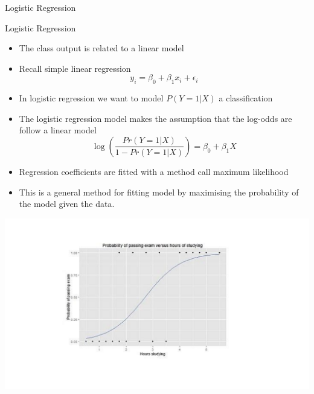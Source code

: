 \documentclass{bredelebeamer}
\begin{document}
\begin{frame}{Logistic Regression}

\begin{exampleblock}{Logistic Regression}
	
	\begin{itemize}
		\item The class output is related to a linear model
		\item Recall simple linear regression
		\begin{equation}
		y_i = \beta_0 + \beta_1x_i + \epsilon_i
		\end{equation}
		\item In logistic regression we want to model $P(Y = 1|X)$ a classification
		\item The logistic regression model makes the assumption that the log-odds are follow a linear model
		\begin{equation}
		\log\left(\frac{Pr(Y = 1|X)}{1 - Pr(Y = 1|X)}\right) = \beta_0 + \beta_1 X
		\end{equation}
		\item Regression coefficients are fitted with a method call maximum likelihood
		\item This is a general method for fitting model by maximising the probability of the model given the data.
	\end{itemize}
	
\end{exampleblock}

\end{frame}

\begin{frame}
\includegraphics[width = 1\textwidth]{logistic}
\end{frame}
\end{document}
